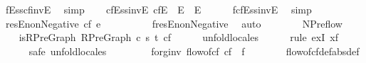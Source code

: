 \begin{isabellebody}
\ f{\isachardot}E{\isacharunderscore}ss{\isacharunderscore}cfinvE\ \isamarkupfalse%
\ simp%
\endisatagproof
{\isafoldproof}%
%
\isadelimproof
\isanewline
%
\endisadelimproof
\isanewline
\ \ \isamarkupfalse%
\ cfE{\isacharunderscore}ss{\isacharunderscore}invE{\isacharcolon}\ {\isachardoublequoteopen}cf{\isachardot}E\ {\isasymsubseteq}\ E\ {\isasymunion}\ E{\isasyminverse}{\isachardoublequoteclose}\isanewline
%
\isadelimproof
\ \ \ \ %
\endisadelimproof
%
\isatagproof
{}\isamarkupfalse%
\ f{\isachardot}cfE{\isacharunderscore}ss{\isacharunderscore}invE\ \isamarkupfalse%
\ simp%
\endisatagproof
{\isafoldproof}%
%
\isadelimproof
\isanewline
%
\endisadelimproof
\ \ \ \ \isanewline
\ \ \isamarkupfalse%
\ resE{\isacharunderscore}nonNegative{\isacharcolon}\ {\isachardoublequoteopen}cf\ e\ {\isasymge}\ {}{\isachardoublequoteclose}\ \ \isanewline
%
\isadelimproof
\ \ \ \ %
\endisadelimproof
%
\isatagproof
{}\isamarkupfalse%
\ f{\isachardot}resE{\isacharunderscore}nonNegative\ \isamarkupfalse%
\ auto%
\endisatagproof
{\isafoldproof}%
%
\isadelimproof
\isanewline
%
\endisadelimproof
\ \ \ \ \ \ \isanewline
{}\isamarkupfalse%
\isanewline
\isanewline
{}\isamarkupfalse%
\ NPreflow\ \isanewline
\ \ \isamarkupfalse%
\ is{\isacharunderscore}RPreGraph{\isacharcolon}\ {\isachardoublequoteopen}RPreGraph\ c\ s\ t\ cf{\isachardoublequoteclose}\isanewline
%
\isadelimproof
\ \ \ \ %
\endisadelimproof
%
\isatagproof
{}\isamarkupfalse%
\ unfold{\isacharunderscore}locales\isanewline
\ \ \ \ \isamarkupfalse%
\ {\isacharparenleft}rule\ exI{\isacharbrackleft}\ x{\isacharequal}f{\isacharbrackright}{\isacharparenright}\isanewline
\ \ \ \ \isamarkupfalse%
\ {\isacharparenleft}safe{\isacharsemicolon}\ unfold{\isacharunderscore}locales{\isacharparenright}\isanewline
\ \ \ \ \isamarkupfalse%
%
\endisatagproof
{\isafoldproof}%
%
\isadelimproof
\isanewline
%
\endisadelimproof
\isanewline
\ \ \isamarkupfalse%
\ fo{\isacharunderscore}rg{\isacharunderscore}inv{\isacharcolon}\ {\isachardoublequoteopen}flow{\isacharunderscore}of{\isacharunderscore}cf\ cf\ {\isacharequal}\ f{\isachardoublequoteclose}\ \ \isanewline
%
\isadelimproof
\ \ \ \ %
\endisadelimproof
%
\isatagproof
{}\isamarkupfalse%
\ flow{\isacharunderscore}of{\isacharunderscore}cf{\isacharunderscore}def{\isacharbrackleft}abs{\isacharunderscore}def{\isacharbrackright}\isanewline

\end{isabellebody}
